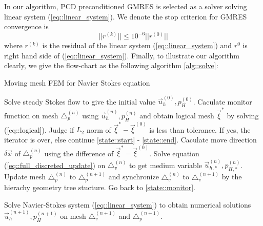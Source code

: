 \documentclass{eajam}
\begin{document}
   In our algorithm, PCD preconditioned GMRES is selected as a solver
   solving linear system (\ref{eq::linear_system}). We denote the stop
   criterion for GMRES convergence is 
   \begin{equation}
     ||r^{(k)}||  \leq 10^{-6} ||r^{(0)}||
   \end{equation}
   where $r^{(k)}$ is the residual of the linear system
   (\ref{eq::linear_system}) and $r^{0}$ is right hand side of
   (\ref{eq::linear_system}). Finally, to illustrate our algorithm
   clearly, we give the flow-chart as the following algorithm
   \ref{alg::solve}:
   \begin{algorithm}
     \caption{Moving mesh FEM for Navier Stokes equation}
     \begin{algorithmic}[1]
       \State Solve steady Stokes flow to give the initial
       value $\vec{u}_h^{(0)}, p_H^{(0)}$.
       \State Caculate monitor function on mesh $\triangle_p^{(n)}$
       using $\vec{u}_h^{(n)}, p_H^{(n)}$ and obtain
       logical mesh $\vec{\xi}^*$ by solving
       (\ref{eq::logical}). \label{state::monitor}
       \State Judge if $L_2$ norm of $\vec{\xi}^* -
       \vec{\xi}^{(0)}$ is less than tolerance. If yes,
       the iterator is over, else continue
       \ref{state::start} - \ref{state::end}.
       \State Caculate move direction $\delta \vec{x}$ of
       $\triangle_p^{(n)}$ using the difference of
       $\vec{\xi}^* - \vec{\xi}^{(0)}$. 
       \label{state::start}
       \State Solve equation (\ref{eq::full_discreted_update}) on
       $\triangle_v^{(n)}$ to get medium variable 
       $\vec{u}_{h, *}^{(n)}, p_{H, *}^{(n)}$.
       \State Update mesh $\triangle_p^{(n)}$ to $\triangle_p^{(n +
         1)}$ and synchronize $\triangle_v^{(n)}$ to
       $\triangle_v^{(n + 1)}$ by the hierachy geometry tree
       stucture.
       \State Go back to \ref{state::monitor}. \label{state::end}       
       
       \State Solve Navier-Stokes system
       (\ref{eq::linear_system}) to obtain numerical
       solutions $\vec{u}_h^{(n + 1)}, p_H^{(n + 1)}$ on
       mesh $\triangle_v^{(n + 1)}$ and $\triangle_p^{(n
         + 1)}$.
       \EndWhile     
     \end{algorithmic}
     \label{alg::solve}
   \end{algorithm}

 
\end{document}
